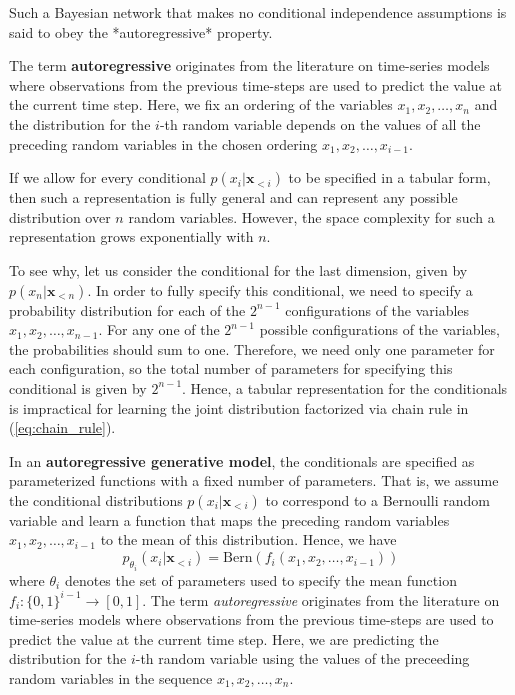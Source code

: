 Such a Bayesian network that makes no conditional independence assumptions is said 
to obey the *autoregressive* property.

The term {\bf autoregressive} originates from the literature on time-series models 
where observations from the previous time-steps are used to predict the value at 
the current time step. Here, we fix an ordering of the variables $x_1, x_2, \ldots, 
x_n$ and the distribution for the $i$-th random variable depends on the values of 
all the preceding random variables in the chosen ordering $x_1, x_2, \ldots, x_{i-1}$.

If we allow for every conditional $p(x_i \vert \mathbf{x}_{< i})$ to be specified 
in a tabular form, then such a representation is fully general and can represent 
any possible distribution over $n$ random variables. However, the space complexity 
for such a representation grows exponentially with $n$.

To see why, let us consider the conditional for the last dimension, given by 
$p(x_n \vert \mathbf{x}_{< n})$. In order to fully specify this conditional, we need 
to specify a probability distribution for each of the $2^{n-1}$ configurations of 
the variables $x_1, x_2, \ldots, x_{n-1}$. For any one of the $2^{n-1}$ possible 
configurations of the variables, the probabilities should sum to one. Therefore, we 
need only one parameter for each configuration, so the total number of parameters 
for specifying this conditional is given by $2^{n-1}$. Hence, a tabular 
representation for the conditionals is impractical for learning the joint 
distribution factorized via chain rule in (\ref{eq:chain_rule}).

In an {\bf autoregressive generative model}, the conditionals are specified as 
parameterized functions with a fixed number of parameters. That is, we assume the 
conditional distributions $p(x_i \vert \mathbf{x}_{<i})$ to correspond to a Bernoulli 
random variable and learn a function that maps the preceding random variables 
$x_1, x_2, \ldots, x_{i-1}$ to the mean of this distribution. Hence, we have
$$
p_{\theta_i}(x_i \vert \mathbf{x}_{< i}) = \mathrm{Bern}(f_i(x_1, x_2, \ldots, x_{i-1}))
$$
where $\theta_i$ denotes the set of parameters used to specify the mean function 
$f_i: \{0,1\}^{i-1}\rightarrow [0,1]$. The term \textit{autoregressive} originates from 
the literature on time-series models where observations from the previous time-steps are 
used to predict the value at the current time step. Here, we are predicting the 
distribution for the $i$-th random variable using the values of the preceeding random 
variables in the sequence $x_1, x_2, \ldots, x_n$.

